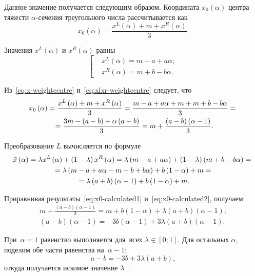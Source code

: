 Данное значение получается следующим образом. Координата $x_0 \left( \alpha  \right)$ центра тяжести $\alpha$-сечения треугольного числа рассчитывается как
\begin{equation}
\label{eq:x-weightcentre}
  x_0\left( \alpha  \right)=\frac{x^L\left( \alpha  \right)+m+x^R\left( \alpha  \right)}{3}.
\end{equation}

Значения $x^L\left( \alpha  \right)$ и $x^R\left( \alpha \right)$ равны
\begin{equation}
\label{eq:xlxr-weightcentre}
  \left[ \begin{aligned}
    & x^L\left( \alpha  \right)=m-a+a\alpha; \\ 
    & x^R\left( \alpha  \right)=m+b-b\alpha.
  \end{aligned} \right.
\end{equation}

Из~\eqref{eq:x-weightcentre} и~\eqref{eq:xlxr-weightcentre} следует, что
\begin{gather}
  x_0\left( \alpha  \right)=\frac{x^L\left( \alpha  \right)+m+x^R\left( \alpha  \right)}{3}=\frac{m-a+a\alpha +m+m+b-b\alpha }{3}={} \notag \\ 
  \label{eq:x0-calculated1}
  {}=\frac{3m-\left( a-b \right)+\alpha \left( a-b \right)}{3}=m+\frac{\left( a-b \right)\left( \alpha -1 \right)}{3}.
\end{gather}

Преобразование $L$ вычисляется по формуле
\begin{gather}
  \bar{x}\left( \alpha  \right)=\lambda x^L\left( \alpha  \right)+\left( 1-\lambda  \right)x^R\left( \alpha  \right)=\lambda \left( m-a+a\alpha  \right)+\left( 1-\lambda  \right)\left( m+b-b\alpha  \right)={} \notag \\ 
  {}=\lambda \left( m-a+a\alpha -m-b+b\alpha  \right)+b\left( 1-\alpha  \right)+m={} \notag \\
  \label{eq:x0-calculated2}
  {}=\lambda \left( a+b \right)\left( \alpha -1 \right)+b\left( 1-\alpha  \right)+m.
\end{gather}

Приравнивая результаты~\eqref{eq:x0-calculated1} и~\eqref{eq:x0-calculated2}, получаем:
\begin{gather*}
  m+\frac{\left( a-b \right)\left( \alpha -1 \right)}{3}=m+b\left( 1-\alpha  \right)+\lambda \left( a+b \right)\left( \alpha -1 \right); \\
  \left( a-b \right)\left( \alpha -1 \right)=-3b\left( \alpha -1 \right)+3\lambda \left( a+b \right)\left( \alpha -1 \right).  
\end{gather*}
 
При~$\alpha=1$ равенство выполняется для~всех $\lambda \in \left[ 0; 1\right]$. Для остальных $\alpha$, поделим обе части равенства на~$\alpha-1$:
\begin{equation*}
  a-b=-3b+3\lambda \left( a+b \right),
\end{equation*}
откуда получается искомое значение $\lambda$~\cite{VSU-1}.